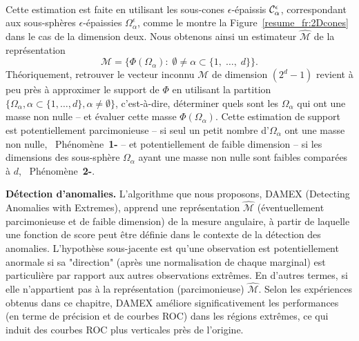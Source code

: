 ~\\
Cette estimation est faite en utilisant les sous-cones $\epsilon$-épaissis $\mathcal{C}_\alpha^\epsilon$, correspondant aux sous-sphères $\epsilon$-épaissies $\Omega_\alpha^\epsilon$, comme le montre la Figure~\ref{resume_fr:2Dcones} dans le cas de la dimension deux.
Nous obtenons ainsi un estimateur $\widehat{\mathcal{M}}$ de la représentation
$$\mathcal{M} = \{ \Phi(\Omega_{\alpha}):\; \emptyset \neq \alpha\subset\{1,\; \ldots,\; d \}\}.$$
Théoriquement, retrouver le vecteur inconnu $\mathcal{M}$ de dimension $(2^{d}-1)$ revient à peu près à approximer le support de $\Phi$ en utilisant la partition
$\{\Omega_\alpha, \alpha\subset\{1,\ldots,d\}, \alpha\neq \emptyset\}$, c'est-à-dire, déterminer quels sont les $\Omega_\alpha$ qui ont
une masse non nulle -- et évaluer cette masse $\Phi(\Omega_\alpha)$. %
Cette estimation de support est potentiellement parcimonieuse -- si seul un petit nombre d'$\Omega_\alpha$ ont une masse non nulle, \ie~Phénomène~\textbf{1-} -- et
potentiellement de faible dimension -- si les dimensions des sous-sphère $\Omega_\alpha$ ayant une masse non nulle sont faibles comparées à $d$, \ie~Phénomène~\textbf{2-}.



\textbf{Détection d'anomalies.}
L'algorithme que nous proposons, DAMEX (Detecting Anomalies with Extremes), apprend une représentation $\widehat{\mathcal{M}}$ (éventuellement parcimonieuse et de faible dimension) de la mesure angulaire, à partir de laquelle une fonction de score peut être définie dans le contexte de la détection des anomalies.
L'hypothèse sous-jacente est qu'une observation est potentiellement anormale si sa "direction" (après une normalisation de chaque marginal) est particulière par rapport aux autres observations extrêmes. En d'autres termes, si elle n'appartient pas à la représentation (parcimonieuse) $\widehat {\mathcal {M}} $. %
Selon les expériences obtenus dans ce chapitre, DAMEX améliore significativement les performances (en terme de précision et de courbes ROC) dans les régions extrêmes, ce qui induit des courbes ROC plus verticales près de l'origine.

